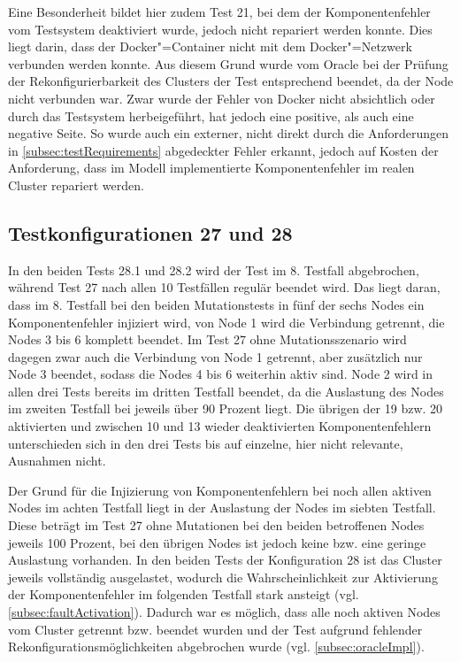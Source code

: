 Eine Besonderheit bildet hier zudem \gls{Test} 21, bei dem der Komponentenfehler vom Testsystem deaktiviert wurde, jedoch nicht repariert werden konnte.
Dies liegt darin, dass der Docker"=Container nicht mit dem Docker"=Netzwerk verbunden werden konnte.
Aus diesem Grund wurde vom Oracle bei der Prüfung der Rekonfigurierbarkeit des Clusters der \gls{Test} entsprechend beendet, da der Node nicht verbunden war.
Zwar wurde der Fehler von Docker nicht absichtlich oder durch das Testsystem herbeigeführt, hat jedoch eine positive, als auch eine negative Seite.
So wurde auch ein externer, nicht direkt durch die Anforderungen in \cref{subsec:testRequirements} abgedeckter Fehler erkannt, jedoch auf Kosten der Anforderung, dass im Modell implementierte Komponentenfehler im realen Cluster repariert werden.

\subsection{Testkonfigurationen 27 und 28}
\label{subsec:noReconf2728}

In den beiden \glspl{Test} 28.1 und 28.2 wird der \gls{Test} im 8. \gls{Testfall} abgebrochen, während \gls{Test} 27 nach allen 10 Testfällen regulär beendet wird.
Das liegt daran, dass im 8. \gls{Testfall} bei den beiden Mutationstests in fünf der sechs Nodes ein Komponentenfehler injiziert wird, von Node 1 wird die Verbindung getrennt, die Nodes 3 bis 6 komplett beendet.
Im \gls{Test} 27 ohne Mutationsszenario wird dagegen zwar auch die Verbindung von Node 1 getrennt, aber zusätzlich nur Node 3 beendet, sodass die Nodes 4 bis 6 weiterhin aktiv sind.
Node 2 wird in allen drei \glspl{Test} bereits im dritten \gls{Testfall} beendet, da die Auslastung des Nodes im zweiten \gls{Testfall} bei jeweils über 90 Prozent liegt.
Die übrigen der 19 bzw. 20 aktivierten und zwischen 10 und 13 wieder deaktivierten Komponentenfehlern unterschieden sich in den drei \glspl{Test} bis auf einzelne, hier nicht relevante, Ausnahmen nicht.

Der Grund für die Injizierung von Komponentenfehlern bei noch allen aktiven Nodes im achten \gls{Testfall} liegt in der Auslastung der Nodes im siebten Testfall.
Diese beträgt im \gls{Test} 27 ohne Mutationen bei den beiden betroffenen Nodes jeweils 100 Prozent, bei den übrigen Nodes ist jedoch keine bzw. eine geringe Auslastung vorhanden.
In den beiden \glspl{Test} der Konfiguration 28 ist das Cluster jeweils vollständig ausgelastet, wodurch die Wahrscheinlichkeit zur Aktivierung der Komponentenfehler im folgenden \gls{Testfall} stark ansteigt (vgl. \cref{subsec:faultActivation}).
Dadurch war es möglich, dass alle noch aktiven Nodes vom Cluster getrennt bzw. beendet wurden und der \gls{Test} aufgrund fehlender Rekonfigurationsmöglichkeiten abgebrochen wurde (vgl. \cref{subsec:oracleImpl}).

